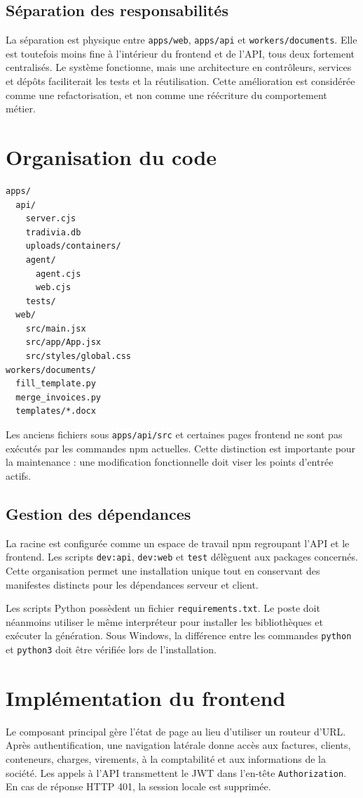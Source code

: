 \documentclass[12pt,a4paper,oneside]{report}
\newcommand{\code}[1]{\texttt{#1}}
\begin{document}
\subsection{Séparation des responsabilités}
La séparation est physique entre \code{apps/web}, \code{apps/api} et \code{workers/documents}. Elle est toutefois moins fine à l'intérieur du frontend et de l'API, tous deux fortement centralisés. Le système fonctionne, mais une architecture en contrôleurs, services et dépôts faciliterait les tests et la réutilisation. Cette amélioration est considérée comme une refactorisation, et non comme une réécriture du comportement métier.

\section{Organisation du code}
\begin{lstlisting}[caption={Arborescence active simplifiée}]
apps/
  api/
    server.cjs
    tradivia.db
    uploads/containers/
    agent/
      agent.cjs
      web.cjs
    tests/
  web/
    src/main.jsx
    src/app/App.jsx
    src/styles/global.css
workers/documents/
  fill_template.py
  merge_invoices.py
  templates/*.docx
\end{lstlisting}

Les anciens fichiers sous \code{apps/api/src} et certaines pages frontend ne sont pas exécutés par les commandes npm actuelles. Cette distinction est importante pour la maintenance : une modification fonctionnelle doit viser les points d'entrée actifs.

\subsection{Gestion des dépendances}
La racine est configurée comme un espace de travail npm regroupant l'API et le frontend. Les scripts \code{dev:api}, \code{dev:web} et \code{test} délèguent aux packages concernés. Cette organisation permet une installation unique tout en conservant des manifestes distincts pour les dépendances serveur et client.

Les scripts Python possèdent un fichier \code{requirements.txt}. Le poste doit néanmoins utiliser le même interpréteur pour installer les bibliothèques et exécuter la génération. Sous Windows, la différence entre les commandes \code{python} et \code{python3} doit être vérifiée lors de l'installation.

\section{Implémentation du frontend}
Le composant principal gère l'état de page au lieu d'utiliser un routeur d'URL. Après authentification, une navigation latérale donne accès aux factures, clients, conteneurs, charges, virements, à la comptabilité et aux informations de la société. Les appels à l'API transmettent le JWT dans l'en-tête \code{Authorization}. En cas de réponse HTTP 401, la session locale est supprimée.
\end{document}
